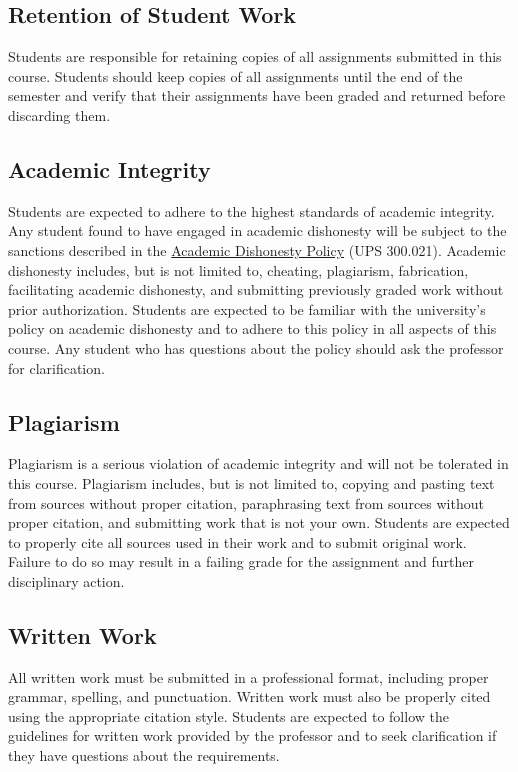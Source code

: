 \documentclass[11pt, letterpaper]{article}
\begin{document}
\subsection*{Retention of Student Work}
Students are responsible for retaining copies of all assignments submitted in this course. Students should keep copies of all assignments until the end of the semester and verify that their assignments have been graded and returned before discarding them.

\subsection*{Academic Integrity}
Students are expected to adhere to the highest standards of academic integrity. Any student found to have engaged in academic dishonesty will be subject to the sanctions described in the \href{https://www.fullerton.edu/senate/publications_policies_resolutions/ups/UPS%20300/UPS%20300.021.pdf}{Academic Dishonesty Policy} (UPS 300.021). Academic dishonesty includes, but is not limited to, cheating, plagiarism, fabrication, facilitating academic dishonesty, and submitting previously graded work without prior authorization. Students are expected to be familiar with the university's policy on academic dishonesty and to adhere to this policy in all aspects of this course. Any student who has questions about the policy should ask the professor for clarification.

\subsection*{Plagiarism}
Plagiarism is a serious violation of academic integrity and will not be tolerated in this course. Plagiarism includes, but is not limited to, copying and pasting text from sources without proper citation, paraphrasing text from sources without proper citation, and submitting work that is not your own. Students are expected to properly cite all sources used in their work and to submit original work. Failure to do so may result in a failing grade for the assignment and further disciplinary action.

\subsection*{Written Work}
All written work must be submitted in a professional format, including proper grammar, spelling, and punctuation. Written work must also be properly cited using the appropriate citation style. Students are expected to follow the guidelines for written work provided by the professor and to seek clarification if they have questions about the requirements.
\end{document}
